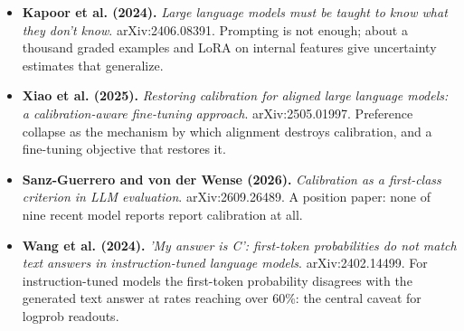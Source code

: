 \documentclass[11pt,letterpaper]{article}
\begin{document}
\begin{itemize}[leftmargin=1.2em,itemsep=3pt]
\item \textbf{Kapoor et al. (2024).} \textit{Large language models must be taught to know what they don't know}. arXiv:2406.08391. Prompting is not enough; about a thousand graded examples and LoRA on internal features give uncertainty estimates that generalize.
\item \textbf{Xiao et al. (2025).} \textit{Restoring calibration for aligned large language models: a calibration-aware fine-tuning approach}. arXiv:2505.01997. Preference collapse as the mechanism by which alignment destroys calibration, and a fine-tuning objective that restores it.
\item \textbf{Sanz-Guerrero and von der Wense (2026).} \textit{Calibration as a first-class criterion in LLM evaluation}. arXiv:2609.26489. A position paper: none of nine recent model reports report calibration at all.
\item \textbf{Wang et al. (2024).} \textit{'My answer is C': first-token probabilities do not match text answers in instruction-tuned language models}. arXiv:2402.14499. For instruction-tuned models the first-token probability disagrees with the generated text answer at rates reaching over 60\%: the central caveat for logprob readouts.
\end{itemize}
\end{document}
